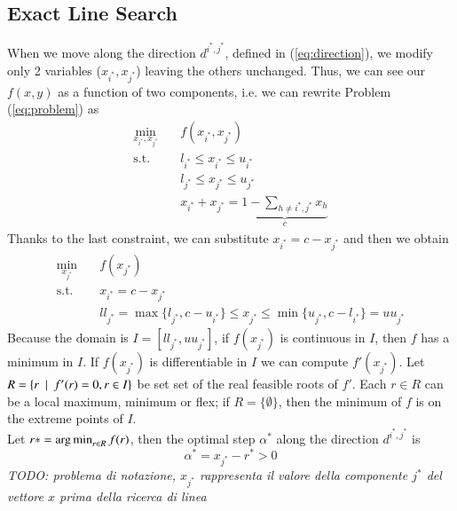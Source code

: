 \subsection{Exact Line Search}
When we move along the direction $d^{i^*,j^*}$, defined in (\ref{eq:direction}), we modify only 2 variables ($x_{i^*}, x_{j^*}$) leaving the others unchanged. Thus, we can see our $f(x,y)$ as a function of two components, i.e. we can rewrite Problem (\ref{eq:problem}) as
\begin{subequations}\label{eq:twocomp} 
\begin{align}
\min_{x_{i^*}, x_{j^*}} & \quad f(x_{i^*}, x_{j^*})  \\
\text{s.t.} & \quad l_{i^*} \leq x_{i^*}  \leq u_{i^*} \\
& \quad l_{j^*} \leq x_{j^*}  \leq u_{j^*} \\
& \quad x_{i^*}+x_{j^*} = \underbrace{1-\sum_{h\ne {i^*},{j^*}}x_h}_c
\end{align}
\end{subequations}
Thanks to the last constraint, we can substitute $x_{i^*} = c - x_{j^*}$ and then we obtain
\begin{subequations}\label{eq:onecomp} 
\begin{align}
\min_{ x_{j^*}} & \quad f(x_{j^*}) \\
\text{s.t.} & \quad x_{i^*} = c - x_{j^*} \\
& \quad ll_{j^*} = \max\{l_{j^*}, c - u_{i^*}\} \leq x_{j^*} \leq \min \{ u_{j^*}, c-l_{i^*}\} = uu_{j^*}
\end{align}
\end{subequations}
Because the domain is $I=[ll_{j^*}, uu_{j^*}]$, if $f(x_{j^*})$ is continuous in $I$, then $f$ has a minimum in $I$. If $f(x_{j^*})$ is differentiable in $I$ we can compute $f'(x_{j^*})$. Let $R = \{ r \enskip | \enskip f'(r) = 0, r \in I \}$ be set set of the real feasible roots of $f'$. Each $r \in R$ can be a local maximum, minimum or flex; if $R = \{ \emptyset \}$, then the minimum of $f$ is on the extreme points of $I$.\\ 
Let $r* = \operatorname*{arg\,min}_{r \in R} f(r)$, then the optimal step $\alpha^*$ along the direction $d^{i^*,j^*}$ is
\begin{equation}
\alpha^* = x_{j^*} - r^* > 0
\end{equation} 
\textit{TODO: problema di notazione, $x_{j^*}$ rappresenta il valore della componente $j^*$ del vettore $x$ prima della ricerca di linea}